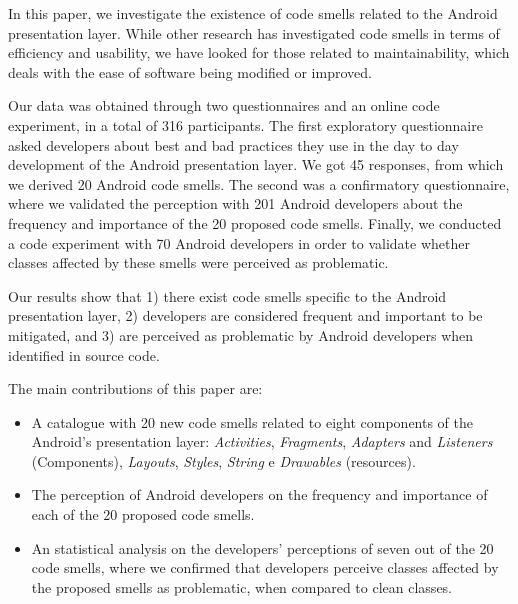In this paper, we investigate the existence of code smells related to the Android presentation layer. While other research has investigated code smells in terms of efficiency and usability, we have looked for those related to maintainability, which deals with the ease of software being modified or improved. 

Our data was obtained through two questionnaires and an online code experiment, in a total of 316 participants. The first exploratory questionnaire asked developers about best and bad practices they use in the day to day development of the Android presentation layer. We got 45 responses, from which we derived 20 Android code smells. The second was a confirmatory questionnaire, where we validated the perception with 201 Android developers about the frequency and importance of the 20 proposed code smells. Finally, we conducted a code experiment with 70 Android developers in order to validate whether classes affected by these smells were perceived as problematic.

Our results show that 1) there exist code smells specific to the Android presentation layer, 2) developers are considered frequent and important to be mitigated, and 3) are perceived as problematic by Android developers when identified in source code. 

The main contributions of this paper are:

\begin{itemize}
  \item A catalogue with 20 new code smells related to eight components of the Android's presentation layer: \textit{Activities}, \textit{Fragments}, \textit{Adapters} and \textit{Listeners} (Components), \textit{Layouts}, \textit{Styles}, \textit{String} e \textit{Drawables} (resources).
  
  \item The perception of Android developers on the frequency and importance of each of the 20 proposed code smells.

  \item An statistical analysis on the developers' perceptions of seven out of the 20 code smells, where we confirmed that developers perceive classes affected by the proposed smells as problematic, when compared to clean classes.
\end{itemize}


